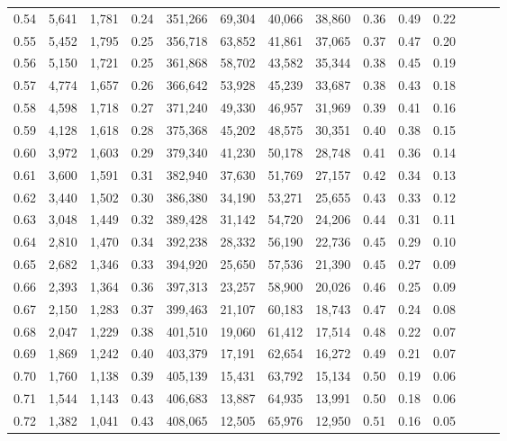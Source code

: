 \begin{tabular}{rrrrrrrrrrrrrr}
0.54 &  5,641 &  1,781 &  0.24 &  351,266 &   69,304 &  40,066 &  38,860 &  0.36 &  0.49 &      0.22 \\
0.55 &  5,452 &  1,795 &  0.25 &  356,718 &   63,852 &  41,861 &  37,065 &  0.37 &  0.47 &      0.20 \\
0.56 &  5,150 &  1,721 &  0.25 &  361,868 &   58,702 &  43,582 &  35,344 &  0.38 &  0.45 &      0.19 \\
0.57 &  4,774 &  1,657 &  0.26 &  366,642 &   53,928 &  45,239 &  33,687 &  0.38 &  0.43 &      0.18 \\
0.58 &  4,598 &  1,718 &  0.27 &  371,240 &   49,330 &  46,957 &  31,969 &  0.39 &  0.41 &      0.16 \\
0.59 &  4,128 &  1,618 &  0.28 &  375,368 &   45,202 &  48,575 &  30,351 &  0.40 &  0.38 &      0.15 \\
0.60 &  3,972 &  1,603 &  0.29 &  379,340 &   41,230 &  50,178 &  28,748 &  0.41 &  0.36 &      0.14 \\
0.61 &  3,600 &  1,591 &  0.31 &  382,940 &   37,630 &  51,769 &  27,157 &  0.42 &  0.34 &      0.13 \\
0.62 &  3,440 &  1,502 &  0.30 &  386,380 &   34,190 &  53,271 &  25,655 &  0.43 &  0.33 &      0.12 \\
0.63 &  3,048 &  1,449 &  0.32 &  389,428 &   31,142 &  54,720 &  24,206 &  0.44 &  0.31 &      0.11 \\
0.64 &  2,810 &  1,470 &  0.34 &  392,238 &   28,332 &  56,190 &  22,736 &  0.45 &  0.29 &      0.10 \\
0.65 &  2,682 &  1,346 &  0.33 &  394,920 &   25,650 &  57,536 &  21,390 &  0.45 &  0.27 &      0.09 \\
0.66 &  2,393 &  1,364 &  0.36 &  397,313 &   23,257 &  58,900 &  20,026 &  0.46 &  0.25 &      0.09 \\
0.67 &  2,150 &  1,283 &  0.37 &  399,463 &   21,107 &  60,183 &  18,743 &  0.47 &  0.24 &      0.08 \\
0.68 &  2,047 &  1,229 &  0.38 &  401,510 &   19,060 &  61,412 &  17,514 &  0.48 &  0.22 &      0.07 \\
0.69 &  1,869 &  1,242 &  0.40 &  403,379 &   17,191 &  62,654 &  16,272 &  0.49 &  0.21 &      0.07 \\
0.70 &  1,760 &  1,138 &  0.39 &  405,139 &   15,431 &  63,792 &  15,134 &  0.50 &  0.19 &      0.06 \\
0.71 &  1,544 &  1,143 &  0.43 &  406,683 &   13,887 &  64,935 &  13,991 &  0.50 &  0.18 &      0.06 \\
0.72 &  1,382 &  1,041 &  0.43 &  408,065 &   12,505 &  65,976 &  12,950 &  0.51 &  0.16 &      0.05 \\

\end{tabular}
